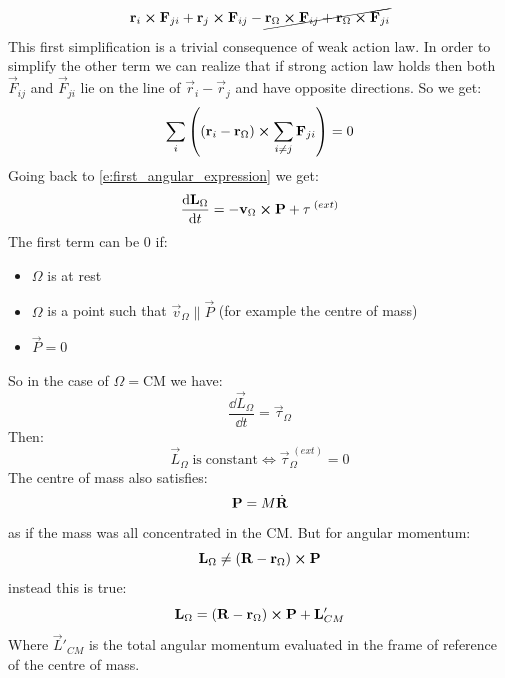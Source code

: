 \begin{equation}
    \vb{r}_i\cross\vb{F}_{ji} + \vb{r}_j\cross\vb{F}_{ij}- \cancel{{\vb{r}_{\Omega}\cross\vb{F}_{ij}+\vb{r}_{\Omega}\cross\vb{F}_{ji}}}
\end{equation}
This first simplification is a trivial consequence of weak action law. In order to simplify the other term we can realize that if strong action law holds then both $\vec{F}_{ij}$ and $\vec{F}_{ji}$ lie on the line of $\vec{r}_i-\vec{r}_j$ and have opposite directions.
So we get:
\begin{equation}
    \displaystyle\sum_{i}\left(\left(\vb{r}_i-\vb{r}_{\Omega}\right)\cross\displaystyle\sum_{i\neq j}\vb{F}_{ji}\right) = 0
\end{equation}
Going back to \eqref{e:first_angular_expression} we get:
\begin{equation}
    \dfrac{\dd{\vb{L}_{\Omega}}}{\dd{t}} = -\vb{v}_{\Omega}\cross\vb{P} + \vb{\tau}^{\;(ext)}
\end{equation}
The first term can be 0 if:
\begin{itemize}
    \item $\Omega$ is at rest
    \item $\Omega$ is a point such that $\vec{v}_{\Omega} \parallel \vec{P}$ (for example the centre of mass)
    \item $\vec{P}=0$
\end{itemize}
So in the case of $\Omega = \mathrm{CM}$ we have:
\begin{equation} \label{e:first_cardinal}
    \dfrac{\dd{\vec{L}_{\Omega}}}{\dd{t}} = \vec{\tau}_{\Omega}
\end{equation}
Then:
\begin{equation}
    \vec{L}_{\Omega}\;\mathrm{is\;constant} \iff \vec{\tau}_{\Omega}^{\;(ext)}=0
\end{equation}
The centre of mass also satisfies:
\begin{equation}
    \vb{P} = M\dot{\vb{R}}
\end{equation}
as if the mass was all concentrated in the CM. But for angular momentum:
\begin{equation}
    \vb{L}_{\Omega} \neq (\vb{R}-\vb{r}_{\Omega})\cross\vb{P}
\end{equation}
instead this is true:
\begin{equation}
    \vb{L}_{\Omega} = (\vb{R}-\vb{r}_{\Omega})\cross\vb{P} + \vb{L}'_{CM}
\end{equation}
Where $\vec{L}'_{CM}$ is the total angular momentum evaluated in the frame of reference of the centre of mass.\\

